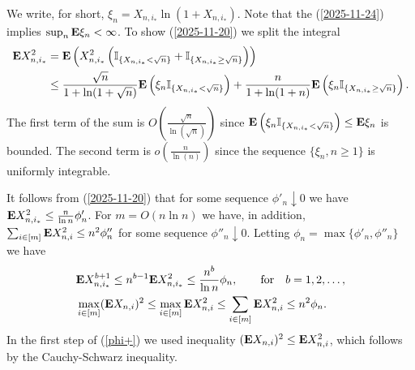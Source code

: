 \documentclass[11pt, a4paper]{article}
\newcommand{\E}{{\bf{E}}}
\begin{document}
We write, for short, $\xi_n=X_{n,i_*}\ln(1+X_{n,i_*})$. Note that the (\ref{2025-11-24}) implies  $\sup_n\E \xi_n<\infty$.
To show (\ref{2025-11-20}) we split the integral
\begin{align*}
\E X^2_{n,i_*}
&
=
\E 
\left(
X^2_{n,i_*}
\left({\mathbb I}_{\{X_{n,i_*}<\sqrt n\}}
+
{\mathbb I}_{\{X_{n,i_*}\ge\sqrt n\}} \right)
\right)
\\
&
\le 
\frac{\sqrt{n}}{1+\ln(1+\sqrt{n})}
\E \left(\xi_n{\mathbb I}_{\{X_{n,i_*}<\sqrt n\}}
\right)
 +
\frac{n}{1+\ln(1+n)}
\E \left(\xi_n{\mathbb I}_{\{X_{n,i_*}\ge\sqrt n\}}
\right).
\end{align*}
The first term of the sum is $O\left(\frac{\sqrt{n}}{\ln(\sqrt{n})}\right)$ since $\E \left(\xi_n{\mathbb I}_{\{X_{n,i_*}<\sqrt n\}}
\right)\le\E \xi_n$ is bounded.
The second term is $o\left(\frac{n}{\ln(n)}\right)$
since the sequence $\{\xi_n, n\ge 1\}$ is uniformly integrable.


It follows from 
 (\ref{2025-11-20}) that for some sequence 
 $\phi'_n\downarrow 0$  we have
$\E X_{n,i_*}^2\le \frac{n}{\ln n}\phi'_n$. For $m=O(n\ln n)$ we have, in addition, $\sum_{i\in[m]} \E X^2_{n,i}\le n^2\phi''_n$ for some sequence $\phi''_n\downarrow 0$.  
Letting $\phi_n=\max\{\phi'_n,\phi''_n\}$ we have
\begin{align}
\label{phi}
&
\E X_{n,i_*}^{b+1}
\le 
n^{b-1}
\E X_{n,i_*}^2
\le 
\frac{n^b}{\ln n}\phi_n,
\qquad
{\text{for}}\quad b=1,2,\dots,
\\
\label{phi+}
&
\max_{i\in [m]}
(\E X_{n,i})^2
\le
\max_{i\in [m]}
\E X^2_{n,i}
\le 
\sum_{i\in[m]} 
\E X^2_{n,i}
\le 
n^2
\phi_n.
\end{align}
In the first step of (\ref{phi+})  we used inequality 
$(\E X_{n,i})^2
\le \E X_{n,i}^2$, which follows by the Cauchy-Schwarz inequality.
\end{document}
